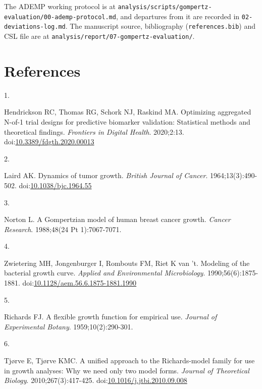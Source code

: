 \documentclass[
  11pt,
]{article}
\newlength{\cslhangindent}
\newlength{\csllabelwidth}
\newenvironment{CSLReferences}[2] %
 {\begin{list}{}{%
  \setlength{\itemindent}{0pt}
  \setlength{\leftmargin}{0pt}
  \setlength{\parsep}{0pt}
  \ifodd #1
   \setlength{\leftmargin}{\cslhangindent}
   \setlength{\itemindent}{-1\cslhangindent}
  \fi
  \setlength{\itemsep}{#2\baselineskip}}}
 {\end{list}}
\newcommand{\CSLLeftMargin}[1]{\parbox[t]{\csllabelwidth}{\strut#1\strut}}
\newcommand{\CSLRightInline}[1]{\parbox[t]{\linewidth - \csllabelwidth}{\strut#1\strut}}
\begin{document}
The ADEMP working protocol is at
\texttt{analysis/scripts/gompertz-evaluation/00-ademp-protocol.md}, and
departures from it are recorded in \texttt{02-deviations-log.md}. The
manuscript source, bibliography (\texttt{references.bib}) and CSL file are at
\texttt{analysis/report/07-gompertz-evaluation/}.

\section{References}\label{references}

\protect{}\label{refs}
\begin{CSLReferences}{0}{1}
\CSLLeftMargin{1. }%
\CSLRightInline{Hendrickson RC, Thomas RG, Schork NJ, Raskind MA. Optimizing aggregated {N}-of-1 trial designs for predictive biomarker validation: Statistical methods and theoretical findings. \emph{Frontiers in Digital Health}. 2020;2:13. doi:\href{https://doi.org/10.3389/fdgth.2020.00013}{10.3389/fdgth.2020.00013}}

\CSLLeftMargin{2. }%
\CSLRightInline{Laird AK. Dynamics of tumor growth. \emph{British Journal of Cancer}. 1964;13(3):490-502. doi:\href{https://doi.org/10.1038/bjc.1964.55}{10.1038/bjc.1964.55}}

\CSLLeftMargin{3. }%
\CSLRightInline{Norton L. A {G}ompertzian model of human breast cancer growth. \emph{Cancer Research}. 1988;48(24 Pt 1):7067-7071.}

\CSLLeftMargin{4. }%
\CSLRightInline{Zwietering MH, Jongenburger I, Rombouts FM, Riet K van 't. Modeling of the bacterial growth curve. \emph{Applied and Environmental Microbiology}. 1990;56(6):1875-1881. doi:\href{https://doi.org/10.1128/aem.56.6.1875-1881.1990}{10.1128/aem.56.6.1875-1881.1990}}

\CSLLeftMargin{5. }%
\CSLRightInline{Richards FJ. A flexible growth function for empirical use. \emph{Journal of Experimental Botany}. 1959;10(2):290-301.}

\CSLLeftMargin{6. }%
\CSLRightInline{Tjørve E, Tjørve KMC. A unified approach to the {R}ichards-model family for use in growth analyses: Why we need only two model forms. \emph{Journal of Theoretical Biology}. 2010;267(3):417-425. doi:\href{https://doi.org/10.1016/j.jtbi.2010.09.008}{10.1016/j.jtbi.2010.09.008}}


\end{CSLReferences}
\end{document}
